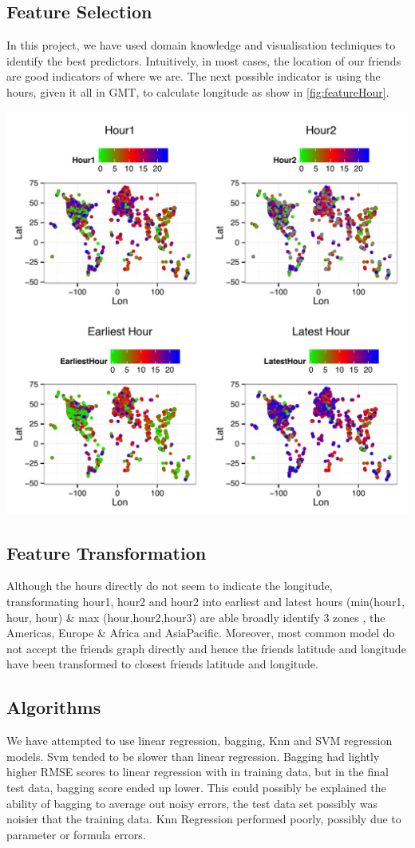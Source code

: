 \subsection{Feature Selection}
In this project, we have used domain knowledge and visualisation techniques to identify the best predictors.  Intuitively, in most cases, the location of our friends are good indicators of where we are. The next possible indicator is using the hours, given it all in GMT, to calculate longitude as show in \ref{fig:featureHour}. 


\begin{center}
\includegraphics[width=0.75\columnwidth, height=.5\columnwidth]{figures/featurePlot.pdf} %
\label{fig:featureHour}
\end{center}

\subsection{Feature Transformation}
Although the hours directly do not seem to indicate the longitude, transformating hour1, hour2 and hour2 into earliest and latest hours (min(hour1, hour, hour) \& max (hour,hour2,hour3) are able broadly identify 3 zones , the Americas, Europe \& Africa and AsiaPacific. Moreover, most common model do not accept the  friends graph directly and hence the friends latitude and longitude have been transformed to closest friends latitude and longitude.

\subsection{Algorithms}
We have attempted to use linear regression, bagging, Knn and SVM regression models. Svm tended to be slower than linear regression. Bagging had lightly higher RMSE scores  to linear regression with  in training data, but in the final test data, bagging score ended up lower. This could possibly be explained the ability of bagging to average out noisy errors, the test data set possibly was noisier that the training data.
Knn Regression performed poorly, possibly due to parameter or formula errors. 

